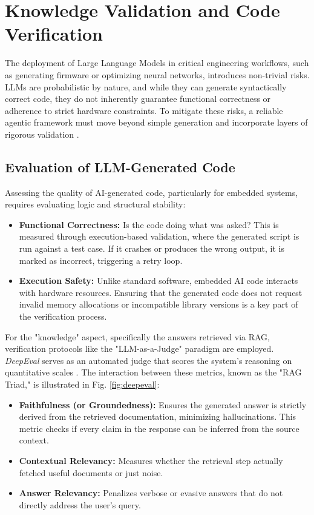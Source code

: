 \section{Knowledge Validation and Code Verification}
The deployment of Large Language Models in critical engineering workflows, such as generating firmware or optimizing neural networks, introduces non-trivial risks. LLMs are probabilistic by nature, and while they can generate syntactically correct code, they do not inherently guarantee functional correctness or adherence to strict hardware constraints. To mitigate these risks, a reliable agentic framework must move beyond simple generation and incorporate layers of rigorous validation \cite{applicationEvaluationCodeGenerated}.

\subsection{Evaluation of LLM-Generated Code}
Assessing the quality of AI-generated code, particularly for embedded systems, requires evaluating logic and structural stability:
\begin{itemize}
    \item \textbf{Functional Correctness:} Is the code doing what was asked? This is measured through execution-based validation, where the generated script is run against a test case. If it crashes or produces the wrong output, it is marked as incorrect, triggering a retry loop.
    \item \textbf{Execution Safety:} Unlike standard software, embedded AI code interacts with hardware resources. Ensuring that the generated code does not request invalid memory allocations or incompatible library versions is a key part of the verification process.
\end{itemize}

For the "knowledge" aspect, specifically the answers retrieved via RAG, verification protocols like the "LLM-as-a-Judge" paradigm are employed. \textit{DeepEval} serves as an automated judge that scores the system's reasoning on quantitative scales \cite{DeepEval2024}. The interaction between these metrics, known as the "RAG Triad," is illustrated in Fig. \ref{fig:deepeval}:
\begin{itemize}
    \item \textbf{Faithfulness (or Groundedness):} Ensures the generated answer is strictly derived from the retrieved documentation, minimizing hallucinations. This metric checks if every claim in the response can be inferred from the source context.
    \item \textbf{Contextual Relevancy:} Measures whether the retrieval step actually fetched useful documents or just noise.
    \item \textbf{Answer Relevancy:} Penalizes verbose or evasive answers that do not directly address the user's query.
\end{itemize}

